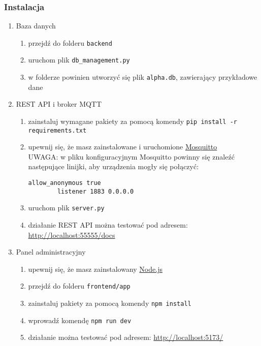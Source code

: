 \subsubsection{Instalacja}
\begin{enumerate}
  \item{
    Baza danych
    \begin{enumerate}
      \item{przejdź do folderu \verb|backend|}
      \item{uruchom plik \verb|db_management.py|}
      \item{w folderze powinien utworzyć się plik \verb|alpha.db|, zawierający przykładowe dane}
    \end{enumerate}
  }
  \item{
    REST API i broker MQTT
    \begin{enumerate}
      \item{zainstaluj wymagane pakiety za pomocą komendy \verb|pip install -r requirements.txt|}
      \item{
        upewnij się, że masz zainstalowane i uruchomione \href{https://mosquitto.org/download/}{Mosquitto} \\
        UWAGA: w pliku konfiguracyjnym Mosquitto powinny się znaleźć następujące linijki, aby urządzenia mogły się połączyć:
        \begin{lstlisting}[caption={Dodatek do pliku \texttt{mosquitto.conf}}]
        allow_anonymous true
        listener 1883 0.0.0.0
        \end{lstlisting}
      }
      \item{uruchom plik \verb|server.py|}
      \item{działanie REST API można testować pod adresem: \url{http://localhost:55555/docs}}
    \end{enumerate}
  }
  \item{
    Panel administracyjny
    \begin{enumerate}
      \item{upewnij się, że masz zainstalowany \href{https://nodejs.org/en}{Node.js}}
      \item{przejdź do folderu \verb|frontend/app|}
      \item{zainstaluj pakiety za pomocą komendy \verb|npm install|}
      \item{wprowadź komendę \verb|npm run dev|}
      \item{działanie można testować pod adresem: \url{http://localhost:5173/}}
    \end{enumerate}
}
\end{enumerate}
